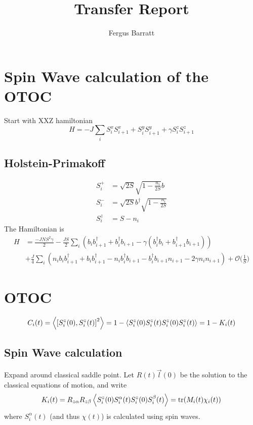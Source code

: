 \documentclass{article}
\title{Transfer Report}
\author{Fergus Barratt}
\begin{document}
\maketitle
\section{Spin Wave calculation of the OTOC}
%
Start with XXZ hamiltonian
\begin{equation}
    H = -J \sum_i S_{i}^xS_{i+1}^x+S_{i}^yS_{i+1}^y+ \gamma S_{i}^zS_{i+1}^z
\end{equation}
%
\subsection{Holstein-Primakoff}
%
\begin{align}
    S_i^+ &= \sqrt{2S} \sqrt{1-\frac{n_i}{2S}} b\\
    S_i^- &= \sqrt{2S}  b^\dagger \sqrt{1-\frac{n_i}{2S}}\\
    S_i^z &= S - n_i
\end{align}
%
The Hamiltonian is 
\begin{align}
    H &= \frac{-JNS^2\gamma}{2} - \frac{JS}{2}\sum_i(b_ib_{i+1}^\dagger+b_{i}^\dagger b_{i+1}-\gamma(b_i^\dagger b_i+b_{i+1}^\dagger b_{i+1}))\\
    &+ \frac{J}{4}\sum_i(n_i b_i b_{i+1}^\dagger + b_i b_{i+1}^\dagger - n_i b_i^\dagger b_{i+1} - b_i^\dagger b_{i+1} n_{i+1} - 2\gamma n_i n_{i+1}) + \mathcal{O}\big(\frac{1}{S}\big)\nonumber
\end{align}
%
\section{OTOC}
%
\begin{equation}
    C_i(t) = \ev{\comm{S_i^z(0)}{S_i^z(t)}^2} = 1-\ev{S_i^z(0)S_i^z(t)S_i^z(0)S_i^z(t)} = 1-K_i(t)
\end{equation}
%
\subsection{Spin Wave calculation}
%
Expand around classical saddle point. Let $R(t)\vec{l}(0)$ be the solution to the classical equations of motion, and write
\begin{equation}
    K_i(t) = R_{z\alpha}R_{z\beta} \ev{S_i^z(0)S_i^\alpha(t)S_i^z(0)S_i^\beta(t)} = \tr(M_i(t)\chi_i(t))
\end{equation}
where $S_i^\alpha(t)$ (and thus $\chi(t)$) is calculated using spin waves.
%
\end{document}
